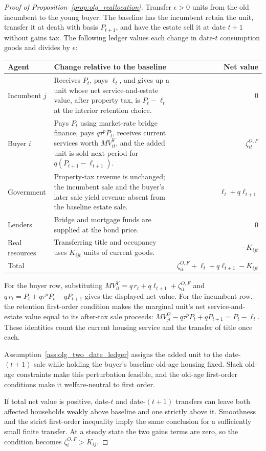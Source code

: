 \begin{proof}[Proof of Proposition~\ref{prop:olg_reallocation}]
Transfer $\epsilon>0$ units from the old incumbent to the young buyer.  The
baseline has the incumbent retain the unit, transfer it at death with basis
$P_{t+1}$, and have the estate sell it at date $t+1$ without gains tax.  The
following ledger values each change in date-$t$ consumption goods and divides
by $\epsilon$:
\begin{center}
\small
\begin{tabularx}{0.96\textwidth}{@{}lXr@{}}
\toprule
Agent & Change relative to the baseline & Net value\\
\midrule
Incumbent $j$
& Receives $P_t$, pays $\ell_t$, and gives up a unit whose net
service-and-estate value, after property tax, is $P_t-\ell_t$ at the interior
retention choice. & $0$\\
Buyer $i$
& Pays $P_t$ using market-rate bridge finance, pays $q\tau^pP_t$, receives
current services worth $MV_{it}^Y$, and the added unit is sold next period for
$q(P_{t+1}-\ell_{t+1})$. & $\zeta_{it}^{O,F}$\\
Government
& Property-tax revenue is unchanged; the incumbent sale and the buyer's later
sale yield revenue absent from the baseline estate sale. &
$\ell_t+q\ell_{t+1}$\\
Lenders
& Bridge and mortgage funds are supplied at the bond price. & $0$\\
Real resources
& Transferring title and occupancy uses $K_{ijt}$ units of current goods. &
$-K_{ijt}$\\
\midrule
Total && $\zeta_{it}^{O,F}+\ell_t+q\ell_{t+1}-K_{ijt}$\\
\bottomrule
\end{tabularx}
\end{center}
For the buyer row, substituting
$MV_{it}^Y=q\,r_t+q\ell_{t+1}+\zeta_{it}^{O,F}$ and
$q\,r_t=P_t+q\tau^pP_t-qP_{t+1}$ gives the displayed net value.  For the
incumbent row, the retention first-order condition makes the marginal unit's
net service-and-estate value equal to its after-tax sale proceeds:
$MV_{jt}^O-q\tau^pP_t+qP_{t+1}=P_t-\ell_t$.  These identities count the
current housing service and the transfer of title once each.

Assumption~\ref{ass:olg_two_date_ledger} assigns the added unit to the
date-$(t+1)$ sale while holding the buyer's baseline old-age housing fixed.
Slack old-age constraints make this perturbation feasible, and the old-age
first-order conditions make it welfare-neutral to first order.

If total net value is positive, date-$t$ and date-$(t+1)$ transfers can leave
both affected households weakly above baseline and one strictly above it.
Smoothness and the strict first-order inequality imply the same conclusion for
a sufficiently small finite transfer.  At a steady state the two gains terms
are zero, so the condition becomes $\zeta_i^{O,F}>K_{ij}$.
\end{proof}

